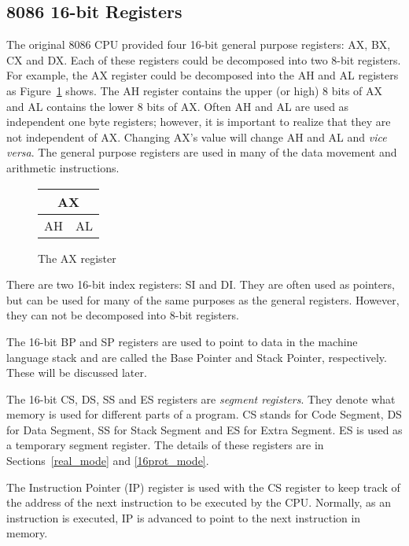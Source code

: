 \subsection{8086 16-bit Registers}

The original 8086 CPU provided four 16-bit general purpose registers:
AX, BX, CX and DX. Each of these registers could be decomposed into
two 8-bit registers. For example, the AX register could be decomposed
into the AH and AL registers as Figure~\ref{fig:AX_reg} shows. The AH
register contains the upper (or high) 8 bits of AX and AL contains the
lower 8 bits of AX. Often AH and AL are used as independent one byte
registers; however, it is important to realize that they are not
independent of AX. Changing AX's value will change AH and AL and
{\em vice versa}\/. The general purpose registers are used in many of
the data movement and arithmetic instructions.

\begin{figure}
\begin{center}
\begin{tabular}{cc}
\multicolumn{2}{c}{AX} \\
\hline
\multicolumn{1}{||c|}{AH} & \multicolumn{1}{c||}{AL} \\
\hline
\end{tabular}
\caption{The AX register \label{fig:AX_reg} }
\end{center}
\end{figure}

There are two 16-bit index registers: SI and
DI. They are often used as pointers, but can be used for many of the
same purposes as the general registers. However, they can not be
decomposed into 8-bit registers.

The 16-bit BP and SP registers are used to point to data in the
machine language stack and are called the Base Pointer
and Stack Pointer, respectively. These will be discussed later.

The 16-bit CS, DS, SS and ES registers are \emph{segment
registers}.  They denote what memory is used
for different parts of a program. CS stands for Code Segment, DS for
Data Segment, SS for Stack Segment and ES for Extra Segment. ES is
used as a temporary segment register. The details of these registers
are in Sections~\ref{real_mode} and \ref{16prot_mode}.

The Instruction Pointer (IP)  register is used with
the CS register to keep track of the address of the next instruction
to be executed by the CPU. Normally, as an instruction is executed, IP
is advanced to point to the next instruction in memory.

